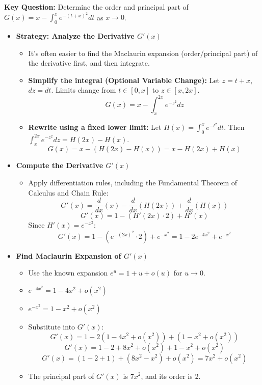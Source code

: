 \begin{cascade}
	\textbf{Key Question:} Determine the order and principal part of $G(x) = x - \int_0^x e^{-(t+x)^2} dt$ as $x \to 0$.
	\begin{itemize}
		\item \textbf{Strategy: Analyze the Derivative $G'(x)$}
		      \begin{itemize}
			      \item It's often easier to find the Maclaurin expansion (order/principal part) of the derivative first, and then integrate.
			      \item \textbf{Simplify the integral (Optional Variable Change):} Let $z=t+x$, $dz=dt$. Limits change from $t \in [0, x]$ to $z \in [x, 2x]$.
			            \[ G(x) = x - \int_x^{2x} e^{-z^2} dz \]
			      \item \textbf{Rewrite using a fixed lower limit:} Let $H(x) = \int_0^x e^{-t^2} dt$. Then $\int_x^{2x} e^{-z^2} dz = H(2x) - H(x)$.
			            \[ G(x) = x - (H(2x) - H(x)) = x - H(2x) + H(x) \]
		      \end{itemize}
		\item \textbf{Compute the Derivative $G'(x)$}
		      \begin{itemize}
			      \item Apply differentiation rules, including the Fundamental Theorem of Calculus and Chain Rule:
			            \[ G'(x) = \frac{d}{dx}(x) - \frac{d}{dx}(H(2x)) + \frac{d}{dx}(H(x)) \]
			            \[ G'(x) = 1 - (H'(2x) \cdot 2) + H'(x) \]
			            Since $H'(x) = e^{-x^2}$:
			            \[ G'(x) = 1 - (e^{-(2x)^2} \cdot 2) + e^{-x^2} = 1 - 2e^{-4x^2} + e^{-x^2} \]
		      \end{itemize}
		\item \textbf{Find Maclaurin Expansion of $G'(x)$}
		      \begin{itemize}
			      \item Use the known expansion $e^u = 1 + u + o(u)$ for $u \to 0$.
			      \item $e^{-4x^2} = 1 - 4x^2 + o(x^2)$
			      \item $e^{-x^2} = 1 - x^2 + o(x^2)$
			      \item Substitute into $G'(x)$:
			            \[ G'(x) = 1 - 2(1 - 4x^2 + o(x^2)) + (1 - x^2 + o(x^2)) \]
			            \[ G'(x) = 1 - 2 + 8x^2 + o(x^2) + 1 - x^2 + o(x^2) \]
			            \[ G'(x) = (1-2+1) + (8x^2 - x^2) + o(x^2) = 7x^2 + o(x^2) \]
			      \item The principal part of $G'(x)$ is $7x^2$, and its order is 2.

\end{itemize}
\end{itemize}
\end{cascade}

